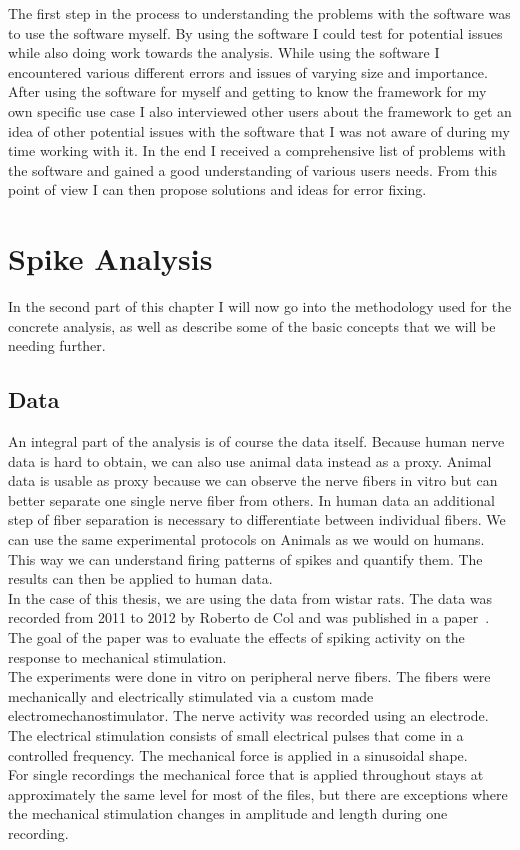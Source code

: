 The first step in the process to understanding the problems with the software was to use the software myself. By using the software I could test for potential issues while also doing work towards the analysis.
While using the software I encountered various different errors and issues of varying size and importance.
After using the software for myself and getting to know the framework for my own specific use case I also interviewed other users about the framework to get an idea of other potential issues with the software that I was not aware of during my time working with it.
In the end I received a comprehensive list of problems with the software and gained a good understanding of various users needs. From this point of view I can then propose solutions and ideas for error fixing.


\section{Spike Analysis}
In the second part of this chapter I will now go into the methodology used for the concrete analysis, as well as describe some of the basic concepts that we will be needing further.

\subsection{Data}
An integral part of the analysis is of course the data itself. Because human nerve data is hard to obtain, we can also use animal data instead as a proxy. Animal data is usable as proxy because we can observe the nerve fibers in vitro but can better separate one single nerve fiber from others. In human data an additional step of fiber separation is necessary to differentiate between individual fibers. We can use the same experimental protocols on Animals as we would on humans. This way we can understand firing patterns of spikes and quantify them. The results can then be applied to human data. \\
In the case of this thesis, we are using the data from wistar rats. The data was recorded from 2011 to 2012 by Roberto de Col and was published in a paper~\cite{roberto}. The goal of the paper was to evaluate the effects of spiking activity on the response to mechanical stimulation. \\
The experiments were done in vitro on peripheral nerve fibers. The fibers were mechanically and electrically stimulated via a custom made electromechanostimulator. The nerve activity was recorded using an electrode. The electrical stimulation consists of small electrical pulses that come in a controlled frequency. The mechanical force is applied in a sinusoidal shape. \\
For single recordings the mechanical force that is applied throughout stays at approximately the same level for most of the files, but there are exceptions where the mechanical stimulation changes in amplitude and length during one recording. 

